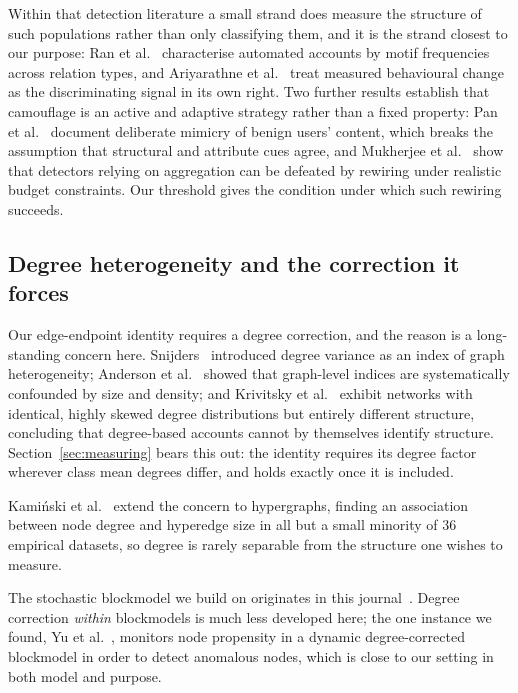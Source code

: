 \documentclass[onecolumn,pdflatex,sn-basic,Numbered]{sn-jnl}
\theoremstyle{thmstyleone}
\theoremstyle{thmstylethree}
\begin{document}
Within that detection literature a small strand does measure the structure of such
populations rather than only classifying them, and it is the strand closest to our
purpose: Ran et al.~\citep{ran2025identifying} characterise automated accounts by
motif frequencies across relation types, and Ariyarathne
et al.~\citep{ariyarathne2026behavior} treat measured behavioural change as the
discriminating signal in its own right. Two further results establish that camouflage is
an active and adaptive strategy rather than a fixed property: Pan et
al.~\citep{pan2026camera} document deliberate mimicry of benign users' content,
which breaks the assumption that structural and attribute cues agree, and Mukherjee
et al.~\citep{mukherjee2026optimal} show that detectors relying on aggregation can
be defeated by rewiring under realistic budget constraints. Our threshold gives the
condition under which such rewiring succeeds.

\subsection{Degree heterogeneity and the correction it forces}
\label{sec:related-degree}

Our edge-endpoint identity requires a degree correction, and the reason is a
long-standing concern here. Snijders~\citep{snijders1981degree} introduced degree
variance as an index of graph heterogeneity; Anderson et al.~\citep{anderson1999interaction}
showed that graph-level indices are systematically confounded by size and density; and
Krivitsky et al.~\citep{krivitsky2009representing} exhibit networks with identical,
highly skewed degree distributions but entirely different structure, concluding that
degree-based accounts cannot by themselves identify structure. Section~\ref{sec:measuring}
bears this out: the identity requires its degree factor wherever class mean degrees
differ, and holds exactly once it is included.

Kami\'nski et al.~\citep{kaminski2026relationships} extend the concern to
hypergraphs, finding an association between node degree and hyperedge size in all but a
small minority of $36$ empirical datasets, so degree is rarely separable from the
structure one wishes to measure.

The stochastic blockmodel we build on originates in this
journal~\citep{holland1983stochastic}. Degree correction \emph{within} blockmodels is
much less developed here; the one instance we found, Yu et
al.~\citep{yu2018detecting}, monitors node propensity in a dynamic degree-corrected
blockmodel in order to detect anomalous nodes, which is close to our setting in both
model and purpose.
\end{document}
